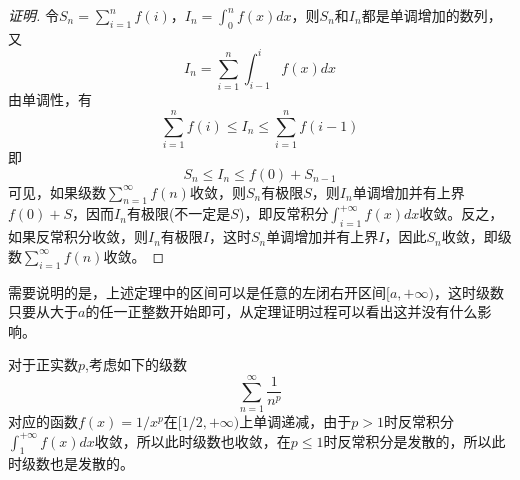\begin{proof}[证明]
  令$S_n=\sum_{i=1}^nf(i)$，$I_n=\int_0^nf(x)dx$，则$S_n$和$I_n$都是单调增加的数列，又
  \[ I_n=\sum_{i=1}^n\int_{i-1}^if(x)dx \]
  由单调性，有
  \[ \sum_{i=1}^nf(i) \leqslant I_n \leqslant \sum_{i=1}^nf(i-1) \]
  即
  \[ S_n \leqslant I_n \leqslant f(0)+S_{n-1} \]
  可见，如果级数$\sum_{n=1}^{\infty}f(n)$收敛，则$S_n$有极限$S$，则$I_n$单调增加并有上界$f(0)+S$，因而$I_n$有极限(不一定是$S$)，即反常积分$\int_{i=1}^{+\infty}f(x)dx$收敛。反之，如果反常积分收敛，则$I_n$有极限$I$，这时$S_n$单调增加并有上界$I$，因此$S_n$收敛，即级数$\sum_{i=1}^{\infty}f(n)$收敛。
\end{proof}

需要说明的是，上述定理中的区间可以是任意的左闭右开区间$[a,+\infty)$，这时级数只要从大于$a$的任一正整数开始即可，从定理证明过程可以看出这并没有什么影响。

\begin{example}
  对于正实数$p$,考虑如下的级数
  \[ \sum_{n=1}^{\infty}\frac{1}{n^p} \]
  对应的函数$f(x)=1/x^p$在$[1/2,+\infty)$上单调递减，由于$p>1$时反常积分$\int_1^{+\infty}f(x)dx$收敛，所以此时级数也收敛，在$p \leqslant 1$时反常积分是发散的，所以此时级数也是发散的。
\end{example}



